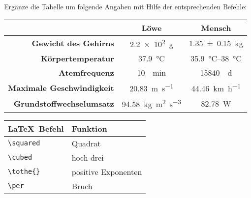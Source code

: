 \begin{frame}[fragile]
	\begin{Aufgabe}
	Ergänze die Tabelle um folgende Angaben mit Hilfe der entsprechenden Befehle:
\end{Aufgabe}
	\begin{outputbox}
		\vspace{-0.1cm}
		\begin{center}
			\begin{tabular}{r|cc}
				\hline
				&	\textbf{Löwe}										& \textbf{Mensch} 						\\ \hline
				\textbf{Gewicht des Gehirns}		&	\SI{2.2e2}{\g}										& \SI{1.35 \pm 0.15}{\kg}				\\ 
				\textbf{Körpertemperatur}			&	\SI{37.9}{\degreeCelsius}							& \SIrange{35.9}{38}{\degreeCelsius}	\\
				\textbf{Atemfrequenz}				&	\SI{10}{\per \minute}								& \SI{15840}{\per\day} 					\\
				\textbf{Maximale Geschwindigkeit}	&	\SI{20.83}{\m\per\s}								& \SI{44.46}{\km\per\hour} 				\\ 
				\textbf{Grundstoffwechselumsatz}	&	\SI{94.58}{\kg\meter\squared\per\second\tothe{3}}	&  \SI{82.78}{\watt}\\
				\hline
			\end{tabular}
		\end{center}
		\vspace{-0.1cm}
	\end{outputbox}
	
	\begin{center}
		\begin{tabular}{ll}
	\toprule
	\LaTeX\ Befehl				& 	Funktion								\\ \midrule
	\lstinline|\squared|	&	Quadrat 				\\
	\lstinline|\cubed|				&	hoch drei				\\
	\lstinline/\tothe{}/			&	 positive Exponenten					\\
	\lstinline/\per/		&	Bruch			\\
	\bottomrule
\end{tabular}
	\end{center}
\end{frame}



